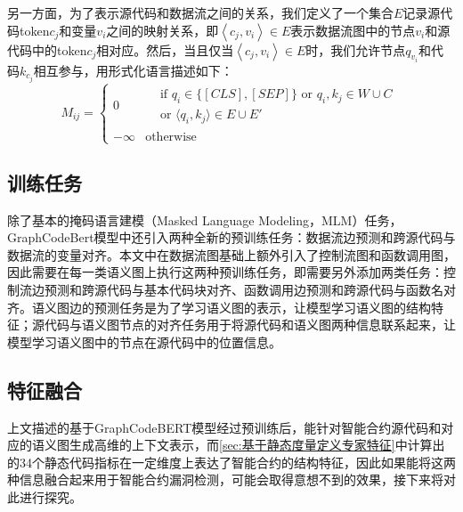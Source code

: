 另一方面，为了表示源代码和数据流之间的关系，我们定义了一个集合$E$记录源代码token$c_j$和变量$v_i$之间的映射关系，即$\left\langle c_j,v_i \right\rangle \in E$表示数据流图中的节点$v_i$和源代码中的token$c_j$相对应。然后，当且仅当$\left\langle c_j,v_i \right\rangle \in E$时，我们允许节点$q_{v_i}$和代码$k_{c_j}$相互参与，用形式化语言描述如下：
\begin{equation}
    M_{ij} =
    \begin{cases}
        0 & \begin{aligned}
               &\text{if } q_i \in \{[CLS], [SEP]\} \text{ or } q_i, k_j \in W \cup C \\
               &\text{or } \langle q_i, k_j \rangle \in E \cup E'
           \end{aligned} \\
        -\infty & \text{otherwise}
    \end{cases}
    \label{eq:mask}
\end{equation}

\subsection{训练任务}
\label{sec:训练任务}
除了基本的掩码语言建模（Masked Language Modeling，MLM）任务\cite{devlin2018bert}，GraphCodeBert模型中还引入两种全新的预训练任务：数据流边预测和跨源代码与数据流的变量对齐。本文中在数据流图基础上额外引入了控制流图和函数调用图，因此需要在每一类语义图上执行这两种预训练任务，即需要另外添加两类任务：控制流边预测和跨源代码与基本代码块对齐、函数调用边预测和跨源代码与函数名对齐。语义图边的预测任务是为了学习语义图的表示，让模型学习语义图的结构特征；源代码与语义图节点的对齐任务用于将源代码和语义图两种信息联系起来，让模型学习语义图中的节点在源代码中的位置信息。

\subsection{特征融合}
\label{sec:特征融合}
上文描述的基于GraphCodeBERT模型经过预训练后，能针对智能合约源代码和对应的语义图生成高维的上下文表示，而\autoref{sec:基于静态度量定义专家特征}中计算出的34个静态代码指标在一定维度上表达了智能合约的结构特征，因此如果能将这两种信息融合起来用于智能合约漏洞检测，可能会取得意想不到的效果，接下来将对此进行探究。

